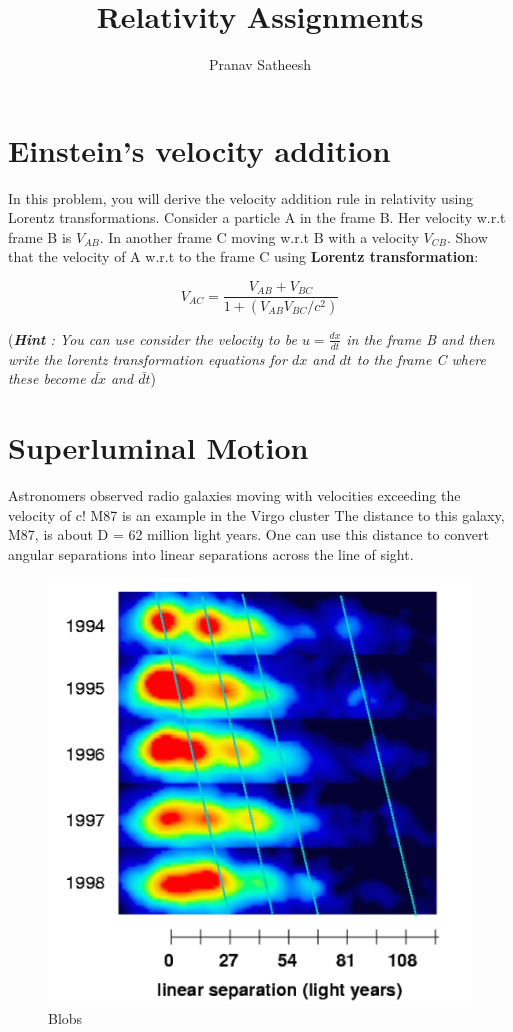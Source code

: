 \documentclass[10pt,a4paper]{article}
\author{Pranav Satheesh}
\title{Relativity Assignments}
\begin{document}
\maketitle

\section{Einstein's velocity addition}

In this problem, you will derive the velocity addition rule in relativity using Lorentz transformations. Consider a particle A in the frame B. Her velocity w.r.t frame B is $V_{AB}$. In another frame C moving w.r.t B with a velocity $V_{CB}$. Show that the velocity of A w.r.t to the frame C using \textbf{Lorentz transformation}:

\begin{equation}
V_{AC} = \frac{V_{AB} + V_{BC}}{1 + (V_{AB} V_{BC} / c^2)}
\end{equation}

(\textit{\textbf{Hint} : You can use consider the velocity to be $u =\frac{dx}{dt}$ in the frame B and then write the lorentz transformation equations for $dx$ and $dt$ to the frame C where these become $\bar{dx}$ and $\bar{dt}$})

\section{Superluminal Motion}
Astronomers observed radio galaxies moving with velocities exceeding the velocity of c!
M87 is an example in the Virgo cluster
The distance to this galaxy, M87, is about D = 62 million light years. One can use this distance to convert angular separations into linear separations across the line of sight. 


\begin{figure}[htbp]
\centering
\includegraphics[scale=0.3]{lumino.png} 
\caption{Blobs}
\end{figure}
\end{document}
